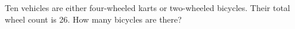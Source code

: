 Ten vehicles are either four-wheeled karts or two-wheeled bicycles. Their total wheel count is 26. How many bicycles are there?
